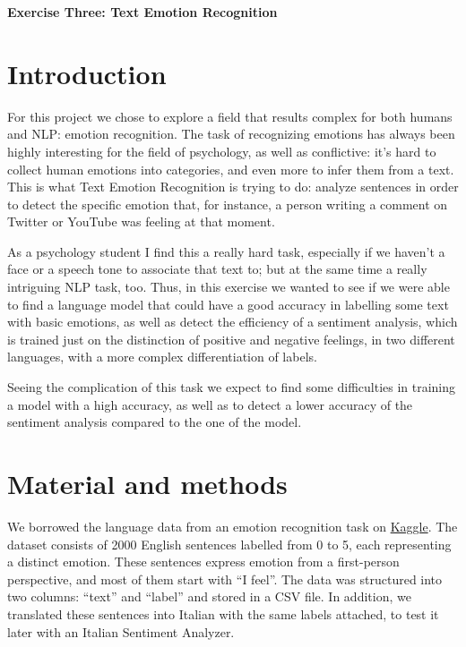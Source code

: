 \begin{flushleft}
    {\fontsize{16}{18}\selectfont\textbf{Exercise Three: Text Emotion Recognition}} 
\end{flushleft}

\section{Introduction}
For this project we chose to explore a field that results complex for both humans and NLP: emotion recognition. The task of recognizing emotions has always been highly interesting for the field of psychology, as well as conflictive: it’s hard to collect human emotions into categories, and even more to infer them from a text. This is what Text Emotion Recognition is trying to do: analyze sentences in order to detect the specific emotion that, for instance, a person writing  a comment on Twitter or YouTube was feeling at that moment. 

As a psychology student I find this a really hard task, especially if we haven’t a face or a speech tone to associate that text to; but at the same time a really intriguing NLP task, too. Thus, in this exercise we wanted to see if we were able to find a language model that could have a good accuracy in labelling some text with basic emotions, as well as detect the efficiency of a sentiment analysis, which is trained just on the distinction of positive and negative feelings, in two different languages, with a more complex differentiation of labels. 

Seeing the complication of this task we expect to find some difficulties in training a model with a high accuracy, as well as to detect a lower accuracy of the sentiment analysis compared to the one of the model.

\section{Material and methods}
We borrowed the language data from an emotion recognition task on \href{https://www.kaggle.com/datasets/parulpandey/emotion-dataset/code}{Kaggle}. The dataset consists of 2000 English sentences labelled from 0 to 5, each representing a distinct emotion. These sentences express emotion from a first-person perspective, and most of them start with “I feel”. The data was structured into two columns: “text” and “label” and stored in a CSV file. In addition, we translated these sentences into Italian with the same labels attached, to test it later with an Italian Sentiment Analyzer. 

